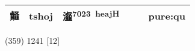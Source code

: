 \documentclass[14pt,a4paper]{scrartcl}
\begin{document}
\begin{longtable}[c]{@{}llllll@{}}
\begin{minipage}[t]{0.14\columnwidth}
䪥
\strut\end{minipage} &
\begin{minipage}[t]{0.14\columnwidth}\raggedright\strut
tshoj
\strut\end{minipage} &
\begin{minipage}[t]{0.14\columnwidth}\raggedright\strut
瀣\textsuperscript{7023~heajH}
\strut\end{minipage} &
\begin{minipage}[t]{0.14\columnwidth}\raggedright\strut
\strut\end{minipage} &
\begin{minipage}[t]{0.14\columnwidth}\raggedright\strut
\strut\end{minipage} &
\begin{minipage}[t]{0.14\columnwidth}\raggedright\strut
pure:qu
\strut\end{minipage}\tabularnewline
\bottomrule
\end{longtable}

(359) 1241 {[}12{]}
\end{document}
